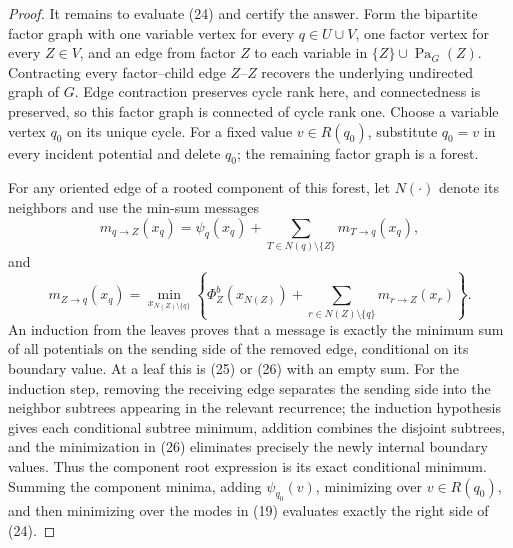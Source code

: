\documentclass{article}
\begin{document}
\begin{proof}
It remains to evaluate (24) and certify the answer.  Form the bipartite factor graph with one variable vertex for every \(q\in U\cup V\), one factor vertex for every \(Z\in V\), and an edge from factor \(Z\) to each variable in \(\{Z\}\cup\operatorname{Pa}_G(Z)\).  Contracting every factor--child edge \(Z\text{--}Z\) recovers the underlying undirected graph of \(G\).  Edge contraction preserves cycle rank here, and connectedness is preserved, so this factor graph is connected of cycle rank one.  Choose a variable vertex \(q_0\) on its unique cycle.  For a fixed value \(v\in R(q_0)\), substitute \(q_0=v\) in every incident potential and delete \(q_0\); the remaining factor graph is a forest.

For any oriented edge of a rooted component of this forest, let \(N(\cdot)\) denote its neighbors and use the min-sum messages
\[
 m_{q\to Z}(x_q)
 =\psi_q(x_q)+
   \sum_{T\in N(q)\setminus\{Z\}}m_{T\to q}(x_q),                    \tag{25}
\]
and
\[
 m_{Z\to q}(x_q)
 =\min_{x_{N(Z)\setminus\{q\}}}
 \left\{
  \Phi_Z^b(x_{N(Z)})+
  \sum_{r\in N(Z)\setminus\{q\}}m_{r\to Z}(x_r)
 \right\}.                                                           \tag{26}
\]
An induction from the leaves proves that a message is exactly the minimum sum of all potentials on the sending side of the removed edge, conditional on its boundary value.  At a leaf this is (25) or (26) with an empty sum.  For the induction step, removing the receiving edge separates the sending side into the neighbor subtrees appearing in the relevant recurrence; the induction hypothesis gives each conditional subtree minimum, addition combines the disjoint subtrees, and the minimization in (26) eliminates precisely the newly internal boundary values.  Thus the component root expression is its exact conditional minimum.  Summing the component minima, adding \(\psi_{q_0}(v)\), minimizing over \(v\in R(q_0)\), and then minimizing over the modes in (19) evaluates exactly the right side of (24).


\end{proof}
\end{document}
